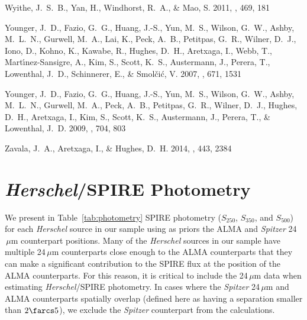 \documentclass[iop]{emulateapj}
\begin{document}
\begin{thebibliography}{106}
{Wyithe}, J.~S.~B., {Yan}, H., {Windhorst}, R.~A., \& {Mao}, S. 2011, \nat,
  469, 181

{Younger}, J.~D., {Fazio}, G.~G., {Huang}, J.-S., {Yun}, M.~S., {Wilson},
  G.~W., {Ashby}, M.~L.~N., {Gurwell}, M.~A., {Lai}, K., {Peck}, A.~B.,
  {Petitpas}, G.~R., {Wilner}, D.~J., {Iono}, D., {Kohno}, K., {Kawabe}, R.,
  {Hughes}, D.~H., {Aretxaga}, I., {Webb}, T., {Mart{\'{\i}}nez-Sansigre}, A.,
  {Kim}, S., {Scott}, K.~S., {Austermann}, J., {Perera}, T., {Lowenthal},
  J.~D., {Schinnerer}, E., \& {Smol{\v c}i{\'c}}, V. 2007, \apj, 671, 1531

{Younger}, J.~D., {Fazio}, G.~G., {Huang}, J.-S., {Yun}, M.~S., {Wilson},
  G.~W., {Ashby}, M.~L.~N., {Gurwell}, M.~A., {Peck}, A.~B., {Petitpas}, G.~R.,
  {Wilner}, D.~J., {Hughes}, D.~H., {Aretxaga}, I., {Kim}, S., {Scott}, K.~S.,
  {Austermann}, J., {Perera}, T., \& {Lowenthal}, J.~D. 2009, \apj, 704, 803

{Zavala}, J.~A., {Aretxaga}, I., \& {Hughes}, D.~H. 2014, \mnras, 443, 2384

\end{thebibliography}


\appendix

\section{{\it Herschel}/SPIRE Photometry}\label{sec:photometry}

We present in Table~\ref{tab:photometry} SPIRE photometry ($S_{250}$,
$S_{350}$, and $S_{500}$) for each {\it Herschel} source in our sample using as
priors the ALMA and {\it Spitzer} 24$\,\mu$m counterpart positions.  Many of
the {\it Herschel} sources in our sample have multiple 24$\,\mu$m counterparts
close enough to the ALMA counterparts that they can make a significant
contribution to the SPIRE flux at the position of the ALMA counterparts.  For
this reason, it is critical to include the 24$\,\mu$m data when estimating {\it
Herschel}/SPIRE photometry.  In cases where the {\it Spitzer} 24$\,\mu$m and
ALMA counterparts spatially overlap (defined here as having a separation
smaller than $2\farcs5$), we exclude the {\it Spitzer} counterpart from the
calculations.  
\end{document}
